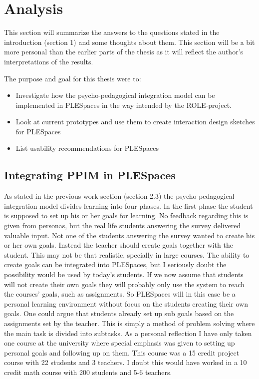 \section {Analysis}
This section will summarize the answers to the questions stated in the introduction (section 1) and some thoughts about them. This section will be a bit more personal than the earlier parts of the thesis as it will reflect the author's interpretations of the results.

The purpose and goal for this thesis were to:
\begin {itemize}
	\item Investigate how the psycho-pedagogical integration model can be implemented in PLESpaces in the way intended by the ROLE-project.
	\item Look at current prototypes and use them to create interaction design sketches for PLESpaces
	\item List usability recommendations for PLESpaces
\end {itemize}

\subsection {Integrating PPIM in PLESpaces}
As stated in the previous work-section (section 2.3) the psycho-pedagogical integration model divides learning into four phases. In the first phase the student is supposed to set up his or her goals for learning. No feedback regarding this is given from personas, but the real life students answering the survey delivered valuable input. Not one of the students answering the survey wanted to create his or her own goals. Instead the teacher should create goals together with the student. This may not be that realistic, specially in large courses. The ability to create goals can be integrated into PLESpaces, but I seriously doubt the possibility would be used by today's students. If we now assume that students will not create their own goals they will probably only use the system to reach the courses' goals, such as assignments. So PLESpaces will in this case be a personal learning environment without focus on the students creating their own goals. One could argue that students already set up sub goals based on the assignments set by the teacher. This is simply a method of problem solving where the main task is divided into subtasks. As a personal reflection I have only taken one course at the university where special emphasis was given to setting up personal goals and following up on them. This course was a 15 credit project course with 22 students and 3 teachers. I doubt this would have worked in a 10 credit math course with 200 students and 5-6 teachers.

